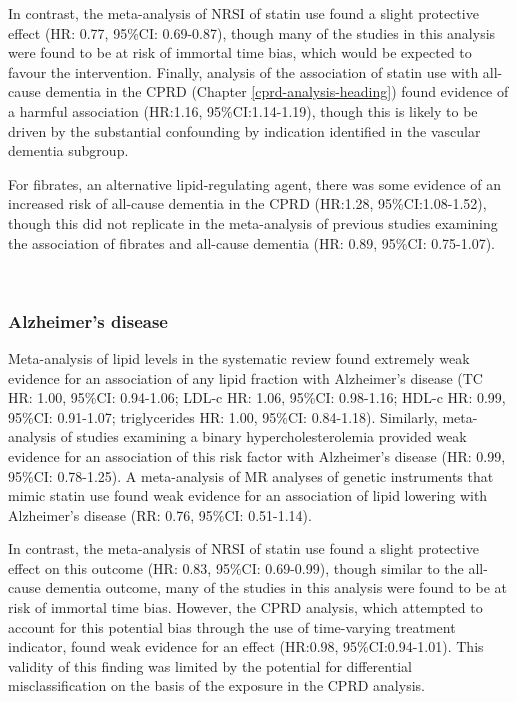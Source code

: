 \documentclass[a4paper, twoside]{templates/ociamthesis}
\begin{document}
In contrast, the meta-analysis of NRSI of statin use found a slight protective effect (HR: 0.77, 95\%CI: 0.69-0.87), though many of the studies in this analysis were found to be at risk of immortal time bias, which would be expected to favour the intervention. Finally, analysis of the association of statin use with all-cause dementia in the CPRD (Chapter \ref{cprd-analysis-heading}) found evidence of a harmful association (HR:1.16, 95\%CI:1.14-1.19), though this is likely to be driven by the substantial confounding by indication identified in the vascular dementia subgroup.

For fibrates, an alternative lipid-regulating agent, there was some evidence of an increased risk of all-cause dementia in the CPRD (HR:1.28, 95\%CI:1.08-1.52), though this did not replicate in the meta-analysis of previous studies examining the association of fibrates and all-cause dementia (HR: 0.89, 95\%CI: 0.75-1.07).

~

\hypertarget{alzheimers-disease-1}{%
\subsubsection{Alzheimer's disease}\label{alzheimers-disease-1}}

Meta-analysis of lipid levels in the systematic review found extremely weak evidence for an association of any lipid fraction with Alzheimer's disease (TC HR: 1.00, 95\%CI: 0.94-1.06; LDL-c HR: 1.06, 95\%CI: 0.98-1.16; HDL-c HR: 0.99, 95\%CI: 0.91-1.07; triglycerides HR: 1.00, 95\%CI: 0.84-1.18). Similarly, meta-analysis of studies examining a binary hypercholesterolemia provided weak evidence for an association of this risk factor with Alzheimer's disease (HR: 0.99, 95\%CI: 0.78-1.25). A meta-analysis of MR analyses of genetic instruments that mimic statin use found weak evidence for an association of lipid lowering with Alzheimer's disease (RR: 0.76, 95\%CI: 0.51-1.14).

In contrast, the meta-analysis of NRSI of statin use found a slight protective effect on this outcome (HR: 0.83, 95\%CI: 0.69-0.99), though similar to the all-cause dementia outcome, many of the studies in this analysis were found to be at risk of immortal time bias. However, the CPRD analysis, which attempted to account for this potential bias through the use of time-varying treatment indicator, found weak evidence for an effect (HR:0.98, 95\%CI:0.94-1.01). This validity of this finding was limited by the potential for differential misclassification on the basis of the exposure in the CPRD analysis.
\end{document}
